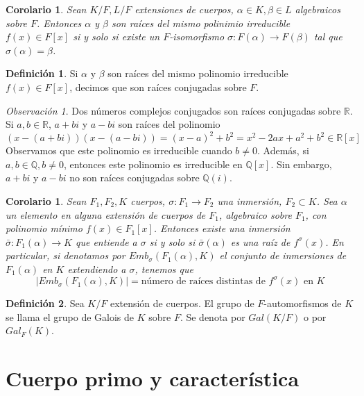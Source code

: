 \documentclass{report}
\newtheorem{corollary}[theorem]{Corolario}
\theoremstyle{remark}
\newtheorem*{remark}{Observación}
\theoremstyle{definition}
\newtheorem{definition}{Definición}[chapter]
\theoremstyle{definition}
\theoremstyle{definition}
\begin{document}
\begin{corollary}
    Sean $K/F, L/F$ extensiones de cuerpos, $\alpha \in K, \beta \in L$ algebraicos sobre $F$.
    Entonces $\alpha$ y $\beta$ son raíces del mismo polinimio irreducible $f(x) \in F[x]$ si y solo si existe un $F$-isomorfismo $\sigma : F(\alpha) \to F(\beta)$ tal que $\sigma(\alpha) = \beta$.
\end{corollary}

\begin{definition}
    Si $\alpha$ y $\beta$ son raíces del mismo polinomio irreducible $f(x) \in F[x]$, decimos que son raíces conjugadas sobre $F$.
\end{definition}

\begin{remark}
    Dos números complejos conjugados son raíces conjugadas sobre $\mathbb{R}$. Si $a, b \in \mathbb{R}$, $a + bi$ y $a - bi$ son raíces del polinomio
    $$(x - (a+bi))(x - (a-bi)) = (x-a)^2 + b^2 = x^2 - 2ax + a^2 + b^2 \in \mathbb{R}[x]$$
    Observamos que este polinomio es irreducible cuando $b \neq 0$.
    Además, si $a, b \in \mathbb{Q}, b \neq 0$, entonces este polinomio es irreducible en $\mathbb{Q}[x]$.
    Sin embargo, $a + bi$ y $a - bi$ no son raíces conjugadas sobre $\mathbb{Q}(i)$.
\end{remark}

\begin{corollary}
    Sean $F_1, F_2, K$ cuerpos, $\sigma : F_1 \to F_2$ una inmersión, $F_2 \subset K$. Sea $\alpha$ un elemento en alguna extensión de cuerpos de $F_1$, algebraico sobre $F_1$, con polinomio mínimo $f(x) \in F_1[x]$. Entonces existe una inmersión $\bar{\sigma} : F_1(\alpha) \to K$ que entiende a $\sigma$ si y solo si $\bar{\sigma}(\alpha)$ es una raíz de $f^\sigma(x)$.
    En particular, si denotamos por $Emb_\sigma(F_1(\alpha), K)$ el conjunto de inmersiones de $F_1(\alpha)$ en $K$ extendiendo a $\sigma$, tenemos que
    $$|Emb_\sigma(F_1(\alpha), K)| = \text{número de raíces distintas de } f^\sigma(x) \text{ en } K$$
\end{corollary}

\begin{definition}
    Sea $K/F$ extensión de cuerpos.
    El grupo de $F$-automorfismos de $K$ se llama el grupo de Galois de $K$ sobre $F$.
    Se denota por $Gal(K/F)$ o por $Gal_F(K)$.
\end{definition}

\section{Cuerpo primo y característica}
\end{document}
